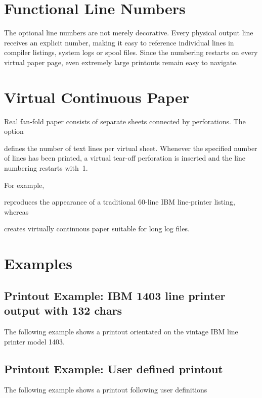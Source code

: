 \documentclass[
11pt,
a4paper,
oneside
]{scrbook}
\begin{document}
\section{Functional Line Numbers}
The optional line numbers are not merely decorative.
Every physical output line receives an explicit number, making it easy
to reference individual lines in compiler listings, system logs or spool
files.
Since the numbering restarts on every virtual paper page, even extremely
large printouts remain easy to navigate.

\section{Virtual Continuous Paper}

Real fan-fold paper consists of separate sheets connected by
perforations.
The option




defines the number of text lines per virtual sheet.
Whenever the specified number of lines has been printed, a virtual
tear-off perforation is inserted and the line numbering restarts with~1.

\noindent For example,




reproduces the appearance of a traditional 60-line IBM line-printer
listing, whereas




creates virtually continuous paper suitable for long log files.
\section{Examples}
\subsection{Printout Example: IBM 1403 line printer output with 132 chars}
\begin{MarginFigure}
\end{MarginFigure}
The following example shows a printout orientated on the vintage IBM line printer model 1403.




\vspace{2ex}





\subsection{Printout Example: User defined printout}
The following example shows a printout following user definitions 
\end{document}
